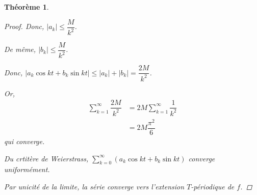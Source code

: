 \documentclass{report}
\newcommand*{\dsum}[4]{\displaystyle\sum_{#1=#2}^{#3}#4}
\newcommand*{\abs}[1]{\left| #1 \right|}
\newcommand*{\lte}{\leqslant}
\newtheorem*{thm}{Th\'eor\`eme}
\theoremstyle{definition}
\theoremstyle{remark}
\begin{document}
\begin{thm}
\begin{proof}
			Donc, $\abs{a_k} \lte \dfrac{M}{k^2}$.

			De m\^eme, $\abs{b_k} \lte \dfrac{M}{k^2}$.

			Donc, $\abs{a_k\cos kt+b_k\sin kt} \lte \abs{a_k} + \abs{b_k} = \dfrac{2M}{k^2}$.

			Or,
			\begin{align*}
				\dsum{k}{1}{\infty}{\dfrac{2M}{k^2}}&= 2M \dsum{k}{1}{\infty}{\dfrac{1}{k^2}}\\
				&= 2M \dfrac{\pi^2}{6}
			\end{align*}
			qui converge.

			Du crtit\`ere de Weierstrass, $\dsum{k}{0}{\infty}{\left(a_k\cos kt+b_k\sin kt\right)}$ converge uniform\'ement.

			Par unicit\'e de la limite, la s\'erie converge vers l'extension $T$-p\'eriodique de $f$.
		\end{proof}
	\end{thm}
\end{document}
